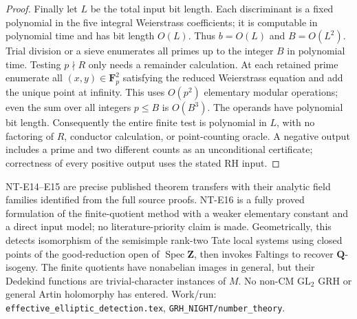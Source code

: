 \begin{proof}
Finally let $L$ be the total input bit length.
Each discriminant is a fixed polynomial in
the five integral Weierstrass coefficients;
it is computable in polynomial time and
has bit length $O(L)$. Thus $b=O(L)$ and
$B=O(L^2)$. Trial division or a sieve
enumerates all primes up to the integer $B$
in polynomial time. Testing $p\nmid R$ only
needs a remainder calculation.
At each retained prime enumerate all
$(x,y)\in\mathbf F_p^2$ satisfying the reduced
Weierstrass equation and add the unique point
at infinity. This uses $O(p^2)$ elementary
modular operations; even the sum over all
integers $p\le B$ is $O(B^3)$.
The operands have polynomial bit length.
Consequently the entire finite test is
polynomial in $L$, with no factoring of $R$,
conductor calculation, or point-counting
oracle. A negative output includes a prime
and two different counts as an unconditional
certificate; correctness of every positive
output uses the stated RH input.
\end{proof}

NT-E14--E15 are precise published theorem
transfers with their analytic field families
identified from the full source proofs.
NT-E16 is a fully proved formulation of the
finite-quotient method with a weaker elementary
constant and a direct input model; no
literature-priority claim is made.
Geometrically, this detects isomorphism of
the semisimple rank-two Tate local systems
using closed points of the good-reduction
open of $\operatorname{Spec}\mathbf Z$,
then invokes Faltings to recover
$\mathbf Q$-isogeny. The finite quotients
have nonabelian images in general, but their
Dedekind functions are trivial-character
instances of $M$. No non-CM $\mathrm{GL}_2$
GRH or general Artin holomorphy has entered.
Work/run: \texttt{effective\_elliptic\_detection.tex},
\texttt{GRH\_NIGHT/number\_theory}.
